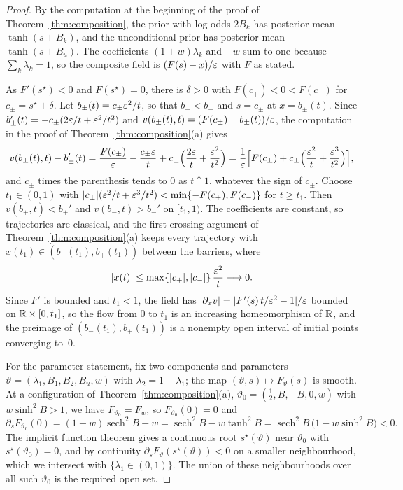 \documentclass{article} %
\makeatletter
\newif\ificlr
\newcommand{\placeblock}[1]{\ificlr\@nameuse{moved@#1}\fi}
\theoremstyle{plain}
\theoremstyle{definition}
\theoremstyle{remark}
\makeatother
\begin{document}
\label{apx:pf-composition-open}
\ificlr\placeblock{compopenprop}\else\propcompositionopen*\fi
\begin{proof}
By the computation at the beginning of the proof of Theorem~\ref{thm:composition}, the prior with
log-odds $2B_k$ has posterior mean $\tanh(s+B_k)$, and the unconditional prior has posterior mean
$\tanh(s+B_u)$. The coefficients $(1+w)\lambda_k$ and $-w$ sum to one because
$\sum_k\lambda_k=1$, so the composite field is $(F(s)-x)/\varepsilon$ with $F$ as stated.

As $F'(s^\star)<0$ and $F(s^\star)=0$, there is $\delta>0$ with $F(c_+)<0<F(c_-)$ for
$c_\pm=s^\star\pm\delta$. Let $b_\pm(t)=c_\pm\varepsilon^2/t$, so that $b_-<b_+$ and $s=c_\pm$ at
$x=b_\pm(t)$. Since $b_\pm'(t)=-c_\pm(2\varepsilon/t+\varepsilon^2/t^2)$ and
$v(b_\pm(t),t)=(F(c_\pm)-b_\pm(t))/\varepsilon$, the computation in the proof of
Theorem~\ref{thm:composition}(a) gives
\[
v(b_\pm(t),t)-b_\pm'(t)
=\frac{F(c_\pm)}{\varepsilon}-\frac{c_\pm\varepsilon}{t}+c_\pm\Bigl(\frac{2\varepsilon}t+\frac{\varepsilon^2}{t^2}\Bigr)
=\frac1{\varepsilon}\Bigl[F(c_\pm)+c_\pm\Bigl(\frac{\varepsilon^2}t+\frac{\varepsilon^3}{t^2}\Bigr)\Bigr],
\]
and $c_\pm$ times the parenthesis tends to $0$ as $t\uparrow1$, whatever the sign of $c_\pm$.
Choose $t_1\in(0,1)$ with $|c_\pm|(\varepsilon^2/t+\varepsilon^3/t^2)<\min\{-F(c_+),F(c_-)\}$ for $t\ge t_1$.
Then $v(b_+,t)<b_+'$ and $v(b_-,t)>b_-'$ on $[t_1,1)$. The coefficients are constant, so
trajectories are classical, and the first-crossing argument of Theorem~\ref{thm:composition}(a)
keeps every trajectory with $x(t_1)\in(b_-(t_1),b_+(t_1))$ between the barriers, where
\[
|x(t)|\le\max\{|c_+|,|c_-|\}\,\frac{\varepsilon^2}{t}\longrightarrow0 .
\]
Since $F'$ is bounded and $t_1<1$, the field has $|\partial_xv|=|F'(s)\,t/\varepsilon^2-1|/\varepsilon$ bounded on
$\mathbb{R}\times[0,t_1]$, so the flow from $0$ to $t_1$ is an increasing homeomorphism of $\mathbb{R}$, and the
preimage of $(b_-(t_1),b_+(t_1))$ is a nonempty open interval of initial points converging to~$0$.

For the parameter statement, fix two components and parameters
$\vartheta=(\lambda_1,B_1,B_2,B_u,w)$ with $\lambda_2=1-\lambda_1$; the map
$(\vartheta,s)\mapsto F_\vartheta(s)$ is smooth. At a configuration of
Theorem~\ref{thm:composition}(a), $\vartheta_0=(\tfrac12,B,-B,0,w)$ with $w\sinh^2B>1$, we have
$F_{\vartheta_0}=F_w$, so $F_{\vartheta_0}(0)=0$ and
\[
\partial_sF_{\vartheta_0}(0)=(1+w)\operatorname{sech}^2B-w
=\operatorname{sech}^2B-w\tanh^2B
=\operatorname{sech}^2B\,\bigl(1-w\sinh^2B\bigr)<0 .
\]
The implicit function theorem gives a continuous root $s^\star(\vartheta)$ near $\vartheta_0$ with
$s^\star(\vartheta_0)=0$, and by continuity $\partial_sF_\vartheta(s^\star(\vartheta))<0$ on a smaller
neighbourhood, which we intersect with $\{\lambda_1\in(0,1)\}$. The union of these neighbourhoods
over all such $\vartheta_0$ is the required open set.
\end{proof}
\placeblock{compopen}
\end{document}
